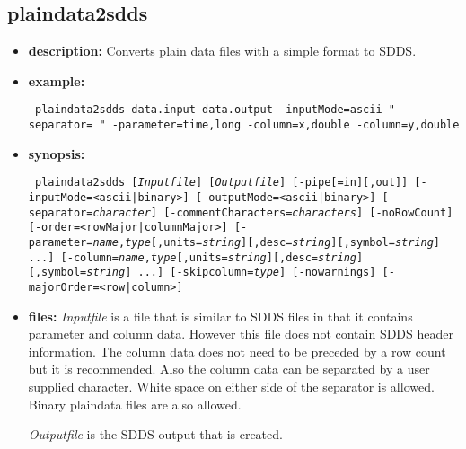 %
\begin{latexonly}
\newpage
\end{latexonly}
\subsection{plaindata2sdds}
\label{plaindata2sdds}

\begin{itemize}
\item {\bf description:} Converts plain data files with a simple format to SDDS.
\item {\bf example:} 
\begin{flushleft}{\tt
plaindata2sdds data.input data.output -inputMode=ascii "-separator= " -parameter=time,long -column=x,double -column=y,double
}\end{flushleft}
\item {\bf synopsis:}
\begin{flushleft}{\tt
plaindata2sdds [{\em Inputfile}] [{\em Outputfile}] [-pipe[=in][,out]] 
[-inputMode=<ascii|binary>]
[-outputMode=<ascii|binary>]
[-separator={\em character}]
[-commentCharacters={\em characters}]
[-noRowCount]
[-order=<rowMajor|columnMajor>]
[-parameter={\em name},{\em type}[,units={\em string}][,desc={\em string}][,symbol={\em string}] ...]
[-column={\em name},{\em type}[,units={\em string}][,desc={\em string}][,symbol={\em string}] ...]
[-skipcolumn={\em type}]
[-nowarnings]
[-majorOrder=<row|column>]
}\end{flushleft}
\item {\bf files: }
{\em Inputfile} is a file that is similar to SDDS files in that it contains parameter and column data. However this file does not contain SDDS header information. The column data does not need to be preceded by a row count but it is recommended. Also the column data can be separated by a user supplied character. White space on either side of the separator is allowed. Binary plaindata files are also allowed.

{\em Outputfile} is the SDDS output that is created.


\end{itemize}
